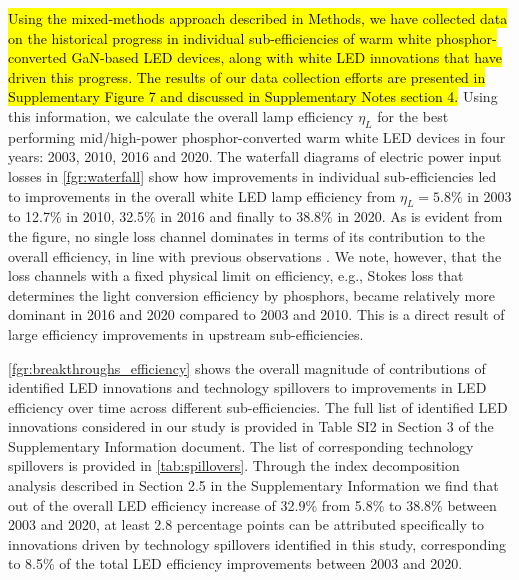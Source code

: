 \documentclass[parskip=full]{article}
\newcommand{\hlcolor}[2][yellow]{ {\sethlcolor{#1} \hl{#2}} }
\begin{document}
\hlcolor[green]{Using the mixed-methods approach described in Methods, we have collected data on the historical progress in individual sub-efficiencies of warm white phosphor-converted GaN-based LED devices, along with white LED innovations that have driven this progress. The results of our data collection efforts are presented in Supplementary Figure 7 and discussed in Supplementary Notes section 4.}Using this information, we calculate the overall lamp efficiency $\eta_L$ for the best performing mid/high-power phosphor-converted warm white LED devices in four years: 2003, 2010, 2016 and 2020. The waterfall diagrams of electric power input losses in \cref{fgr:waterfall} show how improvements in individual sub-efficiencies led to improvements in the overall white LED lamp efficiency from $\eta_L=5.8\%$ in 2003 to 12.7\% in 2010, 32.5\% in 2016 and finally to 38.8\% in 2020. As is evident from the figure, no single loss channel dominates in terms of its contribution to the overall efficiency, in line with previous observations \cite{tsao2010solid}. We note, however, that the loss channels with a fixed physical limit on efficiency, e.g., Stokes loss that determines the light conversion efficiency by phosphors, became relatively more dominant in 2016 and 2020 compared to 2003 and 2010.  This is a direct result of large efficiency improvements in upstream sub-efficiencies.

\cref{fgr:breakthroughs_efficiency} shows the overall magnitude of contributions of identified LED innovations and technology spillovers to improvements in LED efficiency over time across different sub-efficiencies. The full list of identified LED innovations considered in our study is provided in Table SI2 in Section 3 of the Supplementary Information document. The list of corresponding technology spillovers is provided in \cref{tab:spillovers}. Through the index decomposition analysis described in Section 2.5 in the Supplementary Information we find that out of the overall LED efficiency increase of 32.9\% from 5.8\% to 38.8\% between 2003 and 2020, at least 2.8 percentage points can be attributed specifically to innovations driven by technology spillovers identified in this study, corresponding to 8.5\% of the total LED efficiency improvements between 2003 and 2020.
\end{document}
